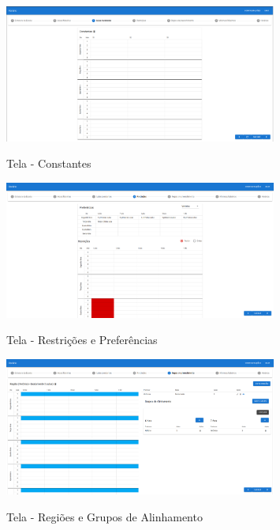 \begin{figure}[h]
	\centering
	\caption{Tela - Constantes}
	\includegraphics[width=0.8\textwidth]{./dados/figuras/tela_constantes}
	\label{fig:tela-constantes}
\end{figure}

\begin{figure}[h]
	\centering
	\caption{Tela - Restrições e Preferências}
	\includegraphics[width=0.8\textwidth]{./dados/figuras/restricoes_nova}
	\label{fig:tela-restricoes}
\end{figure}

\begin{figure}[h]
	\centering
	\caption{Tela - Regiões e Grupos de Alinhamento}
	\includegraphics[width=0.8\textwidth]{./dados/figuras/tela_regioes}
	\label{fig:tela-regioes}
\end{figure}

